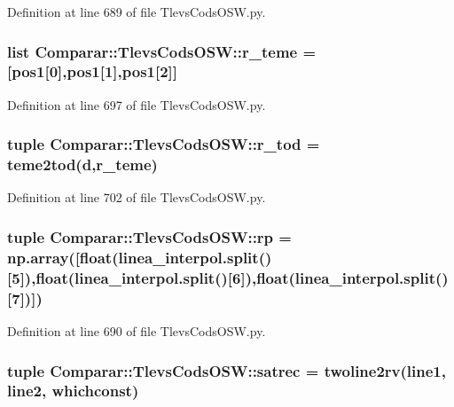 \-Definition at line 689 of file \-Tlevs\-Cods\-O\-S\-W.\-py.

\subsubsection[{r\-\_\-teme}]{\setlength{\rightskip}{0pt plus 5cm}list {\bf \-Comparar\-::\-Tlevs\-Cods\-O\-S\-W\-::r\-\_\-teme} = [pos1[0],pos1[1],pos1[2]]}\label{namespace_comparar_1_1_tlevs_cods_o_s_w_a7e8d3edb1b36c374efcdafd0fb6c69c8}


\-Definition at line 697 of file \-Tlevs\-Cods\-O\-S\-W.\-py.

\subsubsection[{r\-\_\-tod}]{\setlength{\rightskip}{0pt plus 5cm}tuple {\bf \-Comparar\-::\-Tlevs\-Cods\-O\-S\-W\-::r\-\_\-tod} = teme2tod({\bf d},{\bf r\-\_\-teme})}\label{namespace_comparar_1_1_tlevs_cods_o_s_w_aa7d018c2a669560e6201c84adeb53ff3}


\-Definition at line 702 of file \-Tlevs\-Cods\-O\-S\-W.\-py.

\subsubsection[{rp}]{\setlength{\rightskip}{0pt plus 5cm}tuple {\bf \-Comparar\-::\-Tlevs\-Cods\-O\-S\-W\-::rp} = np.\-array([float(linea\-\_\-interpol.\-split()[5]),float(linea\-\_\-interpol.\-split()[6]),float(linea\-\_\-interpol.\-split()[7])])}\label{namespace_comparar_1_1_tlevs_cods_o_s_w_a5e389b559374b48e3d7eabf11bed2c9e}


\-Definition at line 690 of file \-Tlevs\-Cods\-O\-S\-W.\-py.

\subsubsection[{satrec}]{\setlength{\rightskip}{0pt plus 5cm}tuple {\bf \-Comparar\-::\-Tlevs\-Cods\-O\-S\-W\-::satrec} = twoline2rv({\bf line1}, {\bf line2}, {\bf whichconst})}\label{namespace_comparar_1_1_tlevs_cods_o_s_w_a0bfe4765874dd65107c89bf8aea32540}


